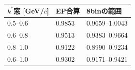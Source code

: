 \par
\vspace{1mm}\begin{tabular}{lll}
\toprule $k^*$窓 [GeV/$c$] & EP合算 & 8binの範囲\\\midrule
0.5--0.6 & 0.9853 & 0.9659--1.0043 \\
0.6--0.8 & 0.9513 & 0.9383--0.9664 \\
0.8--1.0 & 0.9122 & 0.8990--0.9234 \\
0.6--1.0 & 0.9302 & 0.9171--0.9421 \\
\bottomrule\end{tabular}
\par
